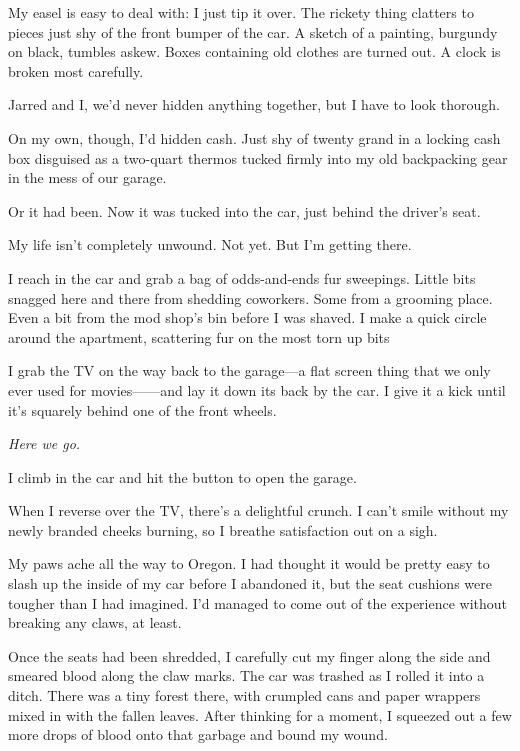 My easel is easy to deal with: I just tip it over. The rickety thing clatters to pieces just shy of the front bumper of the car. A sketch of a painting, burgundy on black, tumbles askew. Boxes containing old clothes are turned out. A clock is broken most carefully.

Jarred and I, we'd never hidden anything together, but I have to look thorough.

On my own, though, I'd hidden cash. Just shy of twenty grand in a locking cash box disguised as a two-quart thermos tucked firmly into my old backpacking gear in the mess of our garage.

Or it had been. Now it was tucked into the car, just behind the driver's seat.

My life isn't completely unwound. Not yet. But I'm getting there.

I reach in the car and grab a bag of odds-and-ends fur sweepings. Little bits snagged here and there from shedding coworkers. Some from a grooming place. Even a bit from the mod shop's bin before I was shaved. I make a quick circle around the apartment, scattering fur on the most torn up bits

I grab the TV on the way back to the garage---a flat screen thing that we only ever used for movies------and lay it down its back by the car. I give it a kick until it's squarely behind one of the front wheels.

\emph{Here we go.}

I climb in the car and hit the button to open the garage.

When I reverse over the TV, there's a delightful crunch. I can't smile without my newly branded cheeks burning, so I breathe satisfaction out on a sigh.

\secdiv{}

\noindent My paws ache all the way to Oregon. I had thought it would be pretty easy to slash up the inside of my car before I abandoned it, but the seat cushions were tougher than I had imagined. I'd managed to come out of the experience without breaking any claws, at least.

Once the seats had been shredded, I carefully cut my finger along the side and smeared blood along the claw marks. The car was trashed as I rolled it into a ditch. There was a tiny forest there, with crumpled cans and paper wrappers mixed in with the fallen leaves. After thinking for a moment, I squeezed out a few more drops of blood onto that garbage and bound my wound.

